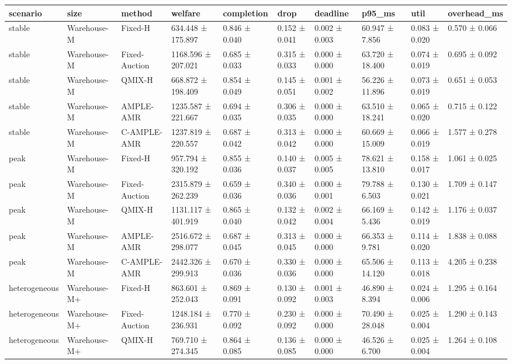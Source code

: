 \begin{tabular}{llllllllll}
\toprule
scenario & size & method & welfare & completion & drop & deadline & p95\_ms & util & overhead\_ms \\
\midrule
stable & Warehouse-M & Fixed-H & 634.448 ± 175.897 & 0.846 ± 0.040 & 0.152 ± 0.041 & 0.002 ± 0.003 & 60.947 ± 7.856 & 0.083 ± 0.020 & 0.570 ± 0.066 \\
stable & Warehouse-M & Fixed-Auction & 1168.596 ± 207.021 & 0.685 ± 0.033 & 0.315 ± 0.033 & 0.000 ± 0.000 & 63.720 ± 18.400 & 0.074 ± 0.019 & 0.695 ± 0.092 \\
stable & Warehouse-M & QMIX-H & 668.872 ± 198.409 & 0.854 ± 0.049 & 0.145 ± 0.051 & 0.001 ± 0.002 & 56.226 ± 11.896 & 0.073 ± 0.019 & 0.651 ± 0.053 \\
stable & Warehouse-M & AMPLE-AMR & 1235.587 ± 221.667 & 0.694 ± 0.035 & 0.306 ± 0.035 & 0.000 ± 0.000 & 63.510 ± 18.241 & 0.065 ± 0.020 & 0.715 ± 0.122 \\
stable & Warehouse-M & C-AMPLE-AMR & 1237.819 ± 220.557 & 0.687 ± 0.042 & 0.313 ± 0.042 & 0.000 ± 0.000 & 60.669 ± 15.009 & 0.066 ± 0.019 & 1.577 ± 0.278 \\
peak & Warehouse-M & Fixed-H & 957.794 ± 320.192 & 0.855 ± 0.036 & 0.140 ± 0.037 & 0.005 ± 0.005 & 78.621 ± 13.810 & 0.158 ± 0.017 & 1.061 ± 0.025 \\
peak & Warehouse-M & Fixed-Auction & 2315.879 ± 262.239 & 0.659 ± 0.036 & 0.340 ± 0.036 & 0.000 ± 0.001 & 79.788 ± 6.503 & 0.130 ± 0.021 & 1.709 ± 0.147 \\
peak & Warehouse-M & QMIX-H & 1131.117 ± 401.919 & 0.865 ± 0.040 & 0.132 ± 0.042 & 0.002 ± 0.004 & 66.169 ± 5.436 & 0.142 ± 0.019 & 1.176 ± 0.037 \\
peak & Warehouse-M & AMPLE-AMR & 2516.672 ± 298.077 & 0.687 ± 0.045 & 0.313 ± 0.045 & 0.000 ± 0.000 & 66.353 ± 9.781 & 0.114 ± 0.020 & 1.838 ± 0.088 \\
peak & Warehouse-M & C-AMPLE-AMR & 2442.326 ± 299.913 & 0.670 ± 0.036 & 0.330 ± 0.036 & 0.000 ± 0.000 & 65.506 ± 14.120 & 0.113 ± 0.018 & 4.205 ± 0.238 \\
heterogeneous & Warehouse-M+ & Fixed-H & 863.601 ± 252.043 & 0.869 ± 0.091 & 0.130 ± 0.092 & 0.001 ± 0.003 & 46.890 ± 8.394 & 0.024 ± 0.006 & 1.295 ± 0.164 \\
heterogeneous & Warehouse-M+ & Fixed-Auction & 1248.184 ± 236.931 & 0.770 ± 0.092 & 0.230 ± 0.092 & 0.000 ± 0.000 & 70.490 ± 28.048 & 0.025 ± 0.004 & 1.290 ± 0.143 \\
heterogeneous & Warehouse-M+ & QMIX-H & 769.710 ± 274.345 & 0.864 ± 0.085 & 0.136 ± 0.085 & 0.000 ± 0.000 & 46.526 ± 6.700 & 0.025 ± 0.004 & 1.264 ± 0.108 \\

\end{tabular}
